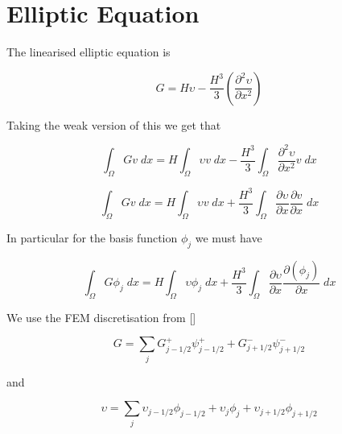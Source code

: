 \documentclass[12pt]{article}
\begin{document}
\section{Elliptic Equation}
The linearised elliptic equation is

\[G = H\upsilon -\frac{H^3}{3} \left(\frac{\partial^2 \upsilon}{\partial x^2}\right)\]

Taking the weak version of this we get that

\[\int_{\Omega}G  v \; dx = H \int_{\Omega} \upsilon v \; dx -\frac{H^3}{3}  \int_{\Omega} \frac{\partial^2 \upsilon}{\partial x^2} v \; dx\]

\[\int_{\Omega}G  v \; dx = H \int_{\Omega} \upsilon v \; dx  + \frac{H^3}{3}  \int_{\Omega} \frac{\partial \upsilon}{\partial x} \frac{\partial v}{\partial x} \; dx\]

In particular for the basis function $\phi_j$ we must have

\[\int_{\Omega}G  \phi_j \; dx = H \int_{\Omega} \upsilon \phi_j \; dx  + \frac{H^3}{3}  \int_{\Omega} \frac{\partial \upsilon}{\partial x} \frac{\partial \left(\phi_j\right)}{\partial x} \; dx\]

We use the FEM discretisation from []

\begin{equation*}
G = \sum_j G^+_{j-1/2}\psi^+_{j-1/2}  + G^-_{j+1/2}\psi^-_{j+1/2}
\end{equation*}

and

\begin{equation}
\upsilon = \sum_j \upsilon_{j-1/2}\phi_{j-1/2} + \upsilon_{j}\phi_{j} + \upsilon_{j+1/2}\phi_{j+1/2}
\end{equation}
\end{document}
